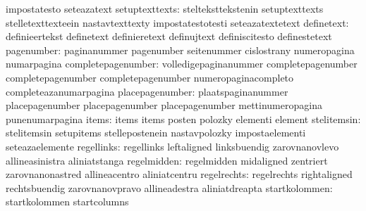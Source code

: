                                   impostatesto                     seteazatext
                  setuptexttexts: stelteksttekstenin               setuptexttexts
                                  stelletexttexteein               nastavtexttexty
                                  impostatestotesti                seteazatextetext
                      definetext: definieertekst                   definetext
                                  definieretext                    definujtext
                                  definiscitesto                   definestetext
                      pagenumber: paginanummer                     pagenumber
                                  seitenummer                      cislostrany
                                  numeropagina                     numarpagina
              completepagenumber: volledigepaginanummer            completepagenumber
                                  completepagenumber               completepagenumber %
                                  numeropaginacompleto             completeazanumarpagina %
                 placepagenumber: plaatspaginanummer               placepagenumber
                                  placepagenumber                  placepagenumber %
                                  mettinumeropagina                punenumarpagina %
                           items: items                            items
                                  posten                           polozky
                                  elementi                         element
                     stelitemsin: stelitemsin                      setupitems
                                  stellepostenein                  nastavpolozky
                                  impostaelementi                  seteazaelemente
                      regellinks: regellinks                       leftaligned
                                  linksbuendig                     zarovnanovlevo
                                  allineasinistra                  aliniatstanga
                     regelmidden: regelmidden                      midaligned
                                  zentriert                        zarovnanonastred
                                  allineacentro                    aliniatcentru
                     regelrechts: regelrechts                      rightaligned
                                  rechtsbuendig                    zarovnanovpravo
                                  allineadestra                    aliniatdreapta
                   startkolommen: startkolommen                    startcolumns
